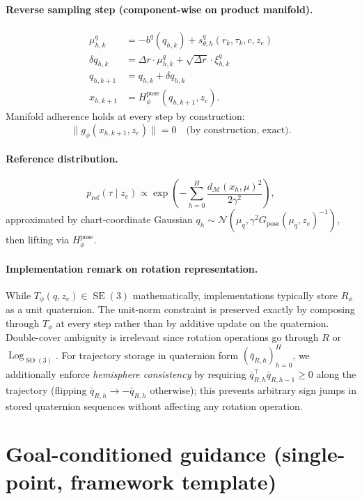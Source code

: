 \documentclass[11pt,a4paper]{article}
\DeclareMathOperator{\Log}{Log}
\DeclareMathOperator{\SE}{SE}
\DeclareMathOperator{\SO}{SO}
\newcommand{\N}{\mathcal{N}}
\newcommand{\Mset}{\mathcal{M}}
\newcommand{\Tphi}{T_\phi}
\newcommand{\Hpose}{H_\phi^{\text{pose}}}
\begin{document}
\paragraph{Reverse sampling step (component-wise on product manifold).}
\begin{align}
\mu_{h, k}^q &= -b^q(q_{h, k}) + s_{\theta, h}^q(r_k, \tau_k, c, z_e) \\
\delta q_{h, k} &= \Delta r \cdot \mu_{h, k}^q + \sqrt{\Delta r} \cdot \xi_{h, k}^q \\
q_{h, k+1} &= q_{h, k} + \delta q_{h, k} \\
x_{h, k+1} &= \Hpose(q_{h, k+1}, z_e).
\end{align}
Manifold adherence holds at every step by construction:
\begin{equation}
\| g_\phi(x_{h, k+1}, z_e) \| = 0 \quad \text{(by construction, exact)}.
\end{equation}

\paragraph{Reference distribution.}
\begin{equation}
p_{\text{ref}}(\tau \mid z_e) \propto \exp\!\left( -\sum_{h=0}^{H} \frac{d_{\Mset}(x_h, \mu)^2}{2 \gamma^2} \right),
\end{equation}
approximated by chart-coordinate Gaussian $q_h \sim \N(\mu_q, \gamma^2 G_{\text{pose}}(\mu_q, z_e)^{-1})$, then lifting via $\Hpose$.

\paragraph{Implementation remark on rotation representation.} While $\Tphi(q, z_e) \in \SE(3)$ mathematically, implementations typically store $R_\phi$ as a unit quaternion. The unit-norm constraint is preserved exactly by composing through $\Tphi$ at every step rather than by additive update on the quaternion. Double-cover ambiguity is irrelevant since rotation operations go through $R$ or $\Log_{\SO(3)}$. For trajectory storage in quaternion form $(\bar q_{R, h})_{h=0}^H$, we additionally enforce \emph{hemisphere consistency} by requiring $\bar q_{R, h}^\top \bar q_{R, h-1} \geq 0$ along the trajectory (flipping $\bar q_{R, h} \to -\bar q_{R, h}$ otherwise); this prevents arbitrary sign jumps in stored quaternion sequences without affecting any rotation operation.

\section{Goal-conditioned guidance (single-point, framework template)}
\end{document}
